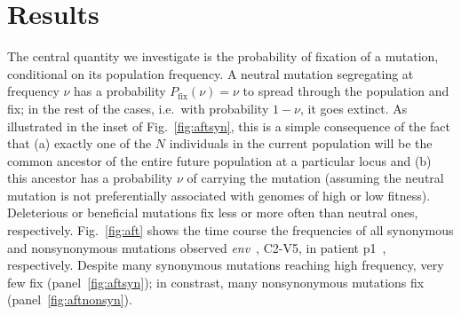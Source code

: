 \documentclass[rmp, twocolumn]{revtex4}
\newcommand{\FIG}[1]{Fig.~\ref{fig:#1}}
\newcommand{\env}{\textit{env}}
\begin{document}
\section{Results}
The central quantity we investigate is the probability of fixation of a
mutation, conditional on its population frequency.  A neutral mutation
segregating at frequency $\nu$ has a probability $P_\text{fix}(\nu) = \nu$ to
spread through the population and fix; in the rest of the cases, i.e.~with
probability $1-\nu$, it goes extinct. As illustrated in the inset of \FIG{aftsyn},
this is a simple consequence of the fact that
(a) exactly one of the $N$ individuals in the current population will be
the common ancestor of the entire future population at a particular locus and
(b) this ancestor has a probability $\nu$ of carrying the mutation (assuming
the neutral mutation is not preferentially associated with genomes of high or
low fitness).
Deleterious or beneficial mutations fix less or
more often than neutral ones, respectively. \FIG{aft} shows 
the time course the frequencies of all synonymous and nonsynonymous mutations
observed \env~, C2-V5, in patient p1~\citep{shankarappa_consistent_1999},
respectively. Despite many synonymous mutations reaching high frequency, very
few fix (panel~\ref{fig:aftsyn}); in constrast, many nonsynonymous mutations fix
(panel~\ref{fig:aftnonsyn}).

\end{document}
